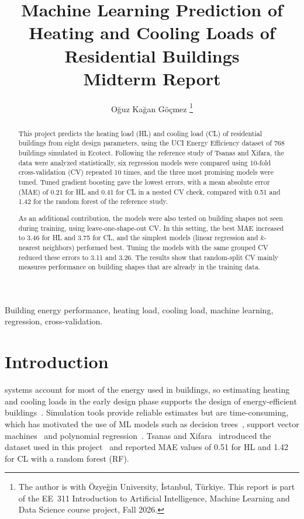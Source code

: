 \documentclass[journal]{IEEEtran}
\newcommand{\authorname}{Oğuz Kağan Göçmez}
\begin{document}
\title{Machine Learning Prediction of Heating and Cooling Loads of Residential Buildings\\[0.3em]
{\LARGE Midterm Report}}

\author{\authorname%
\thanks{The author is with Özyeğin University, İstanbul, Türkiye.
This report is part of the EE~311 Introduction to Artificial Intelligence,
Machine Learning and Data Science course project, Fall 2026.}}

\maketitle

\begin{abstract}
This project predicts the heating load (HL) and cooling load (CL) of residential buildings from eight
design parameters, using the UCI Energy Efficiency dataset of 768 buildings simulated in Ecotect.
Following the reference study of Tsanas and Xifara, the data were analyzed statistically, six regression
models were compared using 10-fold cross-validation (CV) repeated 10 times, and the three most promising
models were tuned. Tuned gradient boosting gave the lowest errors, with a mean absolute error (MAE) of
0.21 for HL and 0.41 for CL in a nested CV check, compared with 0.51 and 1.42 for the random forest of the
reference study.

As an additional contribution, the models were also tested on building shapes not seen during training,
using leave-one-shape-out CV. In this setting, the best MAE increased to 3.46 for HL and 3.75 for CL, and
the simplest models (linear regression and $k$-nearest neighbors) performed best. Tuning the models with
the same grouped CV reduced these errors to 3.11 and 3.26. The results show that random-split CV mainly
measures performance on building shapes that are already in the training data.
\end{abstract}

\begin{IEEEkeywords}
Building energy performance, heating load, cooling load, machine learning, regression, cross-validation.
\end{IEEEkeywords}

\section{Introduction}
 systems account for most of the energy used in buildings, so estimating heating
and cooling loads in the early design phase supports the design of energy-efficient
buildings~\cite{tsanas2012}. Simulation tools provide reliable estimates but are time-consuming, which
has motivated the use of ML models such as decision trees~\cite{yu2010}, support vector
machines~\cite{dong2005} and polynomial regression~\cite{catalina2008}. Tsanas and
Xifara~\cite{tsanas2012} introduced the dataset used in this project~\cite{uci2012} and reported MAE
values of 0.51 for HL and 1.42 for CL with a random forest (RF).
\end{document}
